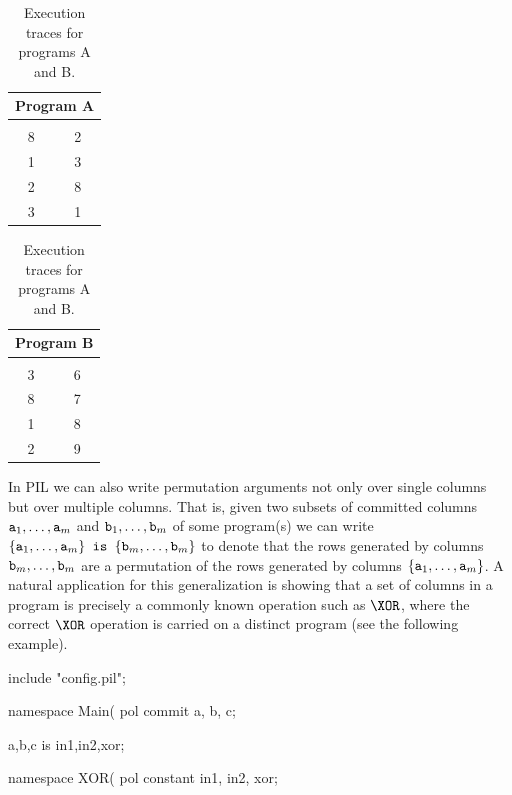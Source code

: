 \begin{table}[H]
    \centering
    \begin{tabular}{|c|c|}
        \hline
        \multicolumn{2}{|c|}{\textbf{Program A}} \\
        \hline
        \att	&\btt	\\ \hline
        8	&2	\\
        1	&3 \\
        2	&8\\
        3	&1 \\
        \hline
    \end{tabular}
    \begin{tabular}{|c|c|}
        \hline
        \multicolumn{2}{|c|}{\textbf{Program B}} \\
        \hline
        \att	&\btt	\\ \hline
        3	&6 \\
        8	&7 \\
        1	&8 \\
        2	&9 \\
        \hline
    \end{tabular}
    \caption{Execution traces for programs \textsf{A} and \textsf{B}. }
    \label{table:is-example-1}
\end{table}

In PIL we can also write permutation arguments not only over single columns but over multiple columns. That is, given two subsets of committed columns $\mathtt{a}_1,\dots,\mathtt{a}_m$ and $\mathtt{b}_1,\dots,\mathtt{b}_m$ of some program(s) we can write $\{\mathtt{a}_1,\dots,\mathtt{a}_m\} \texttt{ is } \{\mathtt{b}_m,\dots,\mathtt{b}_m\}$ to denote that the rows generated by columns $\mathtt{b}_m,\dots,\mathtt{b}_m$ are a permutation of the rows generated by columns $\{\mathtt{a}_1,\dots,\mathtt{a}_m\}$. A natural application for this generalization is showing that a set of columns in a program is precisely a commonly known operation such as $\XOR$, where the correct $\XOR$ operation is carried on a distinct program (see the following example).
\begin{pil}
    include "config.pil";
    
    namespace Main(%
    pol commit a, b, c;
    
    {a,b,c} is {in1,in2,xor};
    
    namespace XOR(%
    pol constant in1, in2, xor;
\end{pil}

